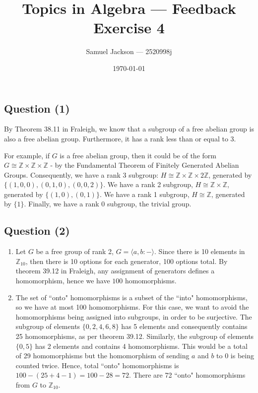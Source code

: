 \documentclass{article}
\title{Topics in Algebra  --- Feedback Exercise 4}
\author{Samuel Jackson --- 2520998j}
\date{\today}
\begin{document}
\newcommand{\order}[1]{|#1|}
\newcommand{\setS}{\mathcal{S}}
\newcommand{\norm}{\trianglelefteq}

\newcommand{\Z}{\mathbb{Z}}

\maketitle

\begin{center}
\section*{Question (1)}
\end{center}

\begin{flushleft}
	By Theorem 38.11 in Fraleigh, we know that a subgroup of a free abelian group is also a free abelian group. Furthermore, it has a rank less than or equal to 3. \newline 
	
	For example, if $G$ is a free abelian group, then it could be of the form $G \cong \Z \times \Z \times \Z$ - by the Fundamental Theorem of Finitely Generated Abelian Groups.
	Consequently, we have a rank 3 subgroup: $H \cong \Z \times \Z \times 2\Z$, generated by $\{(1,0,0), (0,1,0), (0,0,2)\}$.
	We have a rank 2 subgroup, $H \cong \Z \times \Z$, generated by $\{(1,0), (0,1)\}$.
	We have a rank 1 subgroup, $H \cong \Z$, generated by $\{1\}$.
	Finally, we have a rank 0 subgroup, the trivial group. 
\end{flushleft}

\begin{center}
	\section*{Question (2)}
\end{center}

\begin{enumerate}[label=\alph*)]
	\item Let $G$ be a free group of rank 2, $G = \langle a, b : - \rangle$. Since there is 10 elements in $\Z_{10}$, then there is 10 options for each generator, 100 options total. By theorem 39.12 in Fraleigh, any assignment of generators defines a homomorphism, hence we have $100$ homomorphisms.  
	\item The set of ``onto" homomorphisms is a subset of the ``into" homomorphisms, so we have at most 100 homomorphisms. For this case, we want to avoid the homomorphisms being assigned into subgroups, in order to be surjective. The subgroup of elements $\{0, 2, 4, 6, 8\}$ has 5 elements and consequently contains 25 homomorphisms, as per theorem 39.12. Similarly, the subgroup of elements $\{0, 5\}$ has 2 elements and contains 4 homomorphisms. This would be a total of 29 homomorphisms but the homomorphism of sending $a$ and $b$ to $0$ is being counted twice. Hence, total ``onto" homomorphisms is $100 - (25 + 4 - 1) = 100 - 28 = 72$. There are 72 ``onto" homomorphisms from $G$ to $\Z_{10}$.
\end{enumerate}
\end{document}
